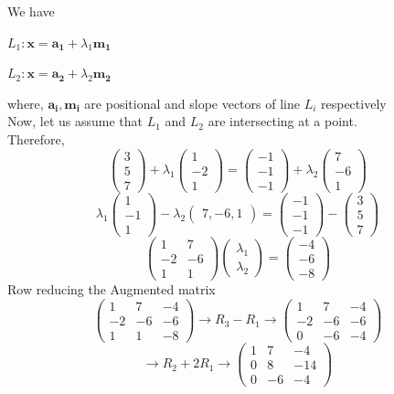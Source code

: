 \documentclass[journal,10pt,twocolumn]{article}
\let\vec\mathbf
\newcommand{\myvec}[1]{\ensuremath{\begin{pmatrix}#1\end{pmatrix}}}
\begin{document}
We have \\
\begin{center}
	$L_1 : \vec{x} = \vec{a_1} + \lambda_1\vec{m_1} $
\end{center}
\begin{center}
	$L_2 : \vec{x} = \vec{a_2} + \lambda_2\vec{m_2} $
\end{center}
where, $\vec{a_i}, \vec{m_i}$ are positional and slope vectors of line $L_i$ respectively\\
Now, let us assume that $L_1$  and  $L_2$ are intersecting at a point. 
\\Therefore,\\
\begin{equation}
	\myvec{3\\5\\7} + \lambda_1\myvec{1\\-2\\1} = \myvec{-1\\-1\\-1} + \lambda_2\myvec{7\\-6\\1}
\end{equation}
\begin{equation}
	\lambda_1 \myvec{1\\-1\\1} - \lambda_2\myvec{7,-6,1} = \myvec{-1\\-1\\-1} - \myvec{3\\5\\7}
\end{equation}
\begin{equation}
	\myvec{1&7\\-2&-6\\1&1} \myvec{\lambda_1\\ \lambda_2} = \myvec{-4\\-6\\-8}
\end{equation}
Row reducing the Augmented matrix\\
\begin{equation}
	\myvec{1&7&-4\\-2&-6&-6\\1&1&-8} \rightarrow R_3 - R_1 \rightarrow\myvec{1&7&-4\\-2&-6&-6\\0&-6&-4}
\end{equation}
\begin{equation}
	\rightarrow R_2 + 2R_1 \rightarrow \myvec{1&7&-4 \\ 0&8&-14\\ 0&-6&-4}
\end{equation}
\end{document}
